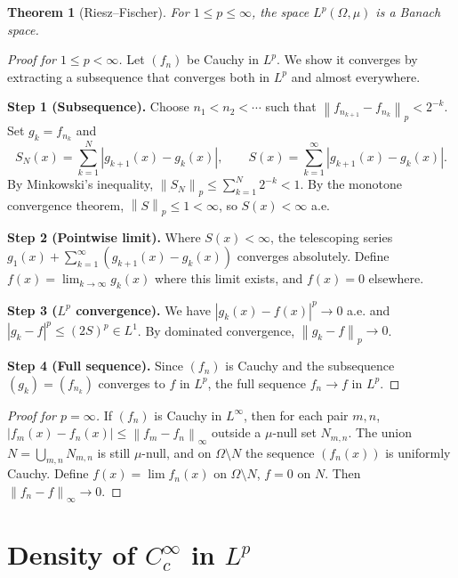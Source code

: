 \documentclass[a4paper,12pt]{book}
\newcommand{\norm}[1]{\left\| #1 \right\|}
\newcommand{\abs}[1]{\left| #1 \right|}
\theoremstyle{definition}
\theoremstyle{plain}
\newtheorem{theorem}[definition]{Theorem}
\theoremstyle{remark}
\begin{document}
\begin{theorem}[Riesz--Fischer]\label{thm:riesz-fischer}
For $1 \le p \le \infty$, the space $L^p(\Omega, \mu)$ is a Banach space.
\end{theorem}

\begin{proof}[Proof for $1 \le p < \infty$]
Let $(f_n)$ be Cauchy in $L^p$. We show it converges by extracting a subsequence
that converges both in $L^p$ and almost everywhere.

\textbf{Step 1 (Subsequence).} Choose $n_1 < n_2 < \cdots$ such that
$\norm{f_{n_{k+1}} - f_{n_k}}_p < 2^{-k}$. Set $g_k = f_{n_k}$ and
\[
  S_N(x) = \sum_{k=1}^{N} \abs{g_{k+1}(x) - g_k(x)}, \qquad
  S(x) = \sum_{k=1}^{\infty} \abs{g_{k+1}(x) - g_k(x)}.
\]
By Minkowski's inequality, $\norm{S_N}_p \le \sum_{k=1}^N 2^{-k} < 1$.
By the monotone convergence theorem,
$\norm{S}_p \le 1 < \infty$, so $S(x) < \infty$ a.e.

\textbf{Step 2 (Pointwise limit).} Where $S(x) < \infty$, the telescoping series
$g_1(x) + \sum_{k=1}^\infty (g_{k+1}(x) - g_k(x))$ converges absolutely.
Define $f(x) = \lim_{k \to \infty} g_k(x)$ where this limit exists, and
$f(x) = 0$ elsewhere.

\textbf{Step 3 ($L^p$ convergence).} We have $\abs{g_k(x) - f(x)}^p \to 0$ a.e.
and $\abs{g_k - f}^p \le (2S)^p \in L^1$. By dominated convergence,
$\norm{g_k - f}_p \to 0$.

\textbf{Step 4 (Full sequence).} Since $(f_n)$ is Cauchy and the subsequence
$(g_k) = (f_{n_k})$ converges to $f$ in $L^p$, the full sequence $f_n \to f$
in $L^p$.
\end{proof}

\begin{proof}[Proof for $p = \infty$]
If $(f_n)$ is Cauchy in $L^\infty$, then for each pair $m, n$,
$\abs{f_m(x) - f_n(x)} \le \norm{f_m - f_n}_\infty$ outside a $\mu$-null set
$N_{m,n}$. The union $N = \bigcup_{m,n} N_{m,n}$ is still $\mu$-null, and on
$\Omega \setminus N$ the sequence $(f_n(x))$ is uniformly Cauchy. Define
$f(x) = \lim f_n(x)$ on $\Omega \setminus N$, $f = 0$ on $N$. Then
$\norm{f_n - f}_\infty \to 0$.
\end{proof}


\section{Density of $C_c^\infty$ in $L^p$}\label{sec:density-Cc}
\end{document}
